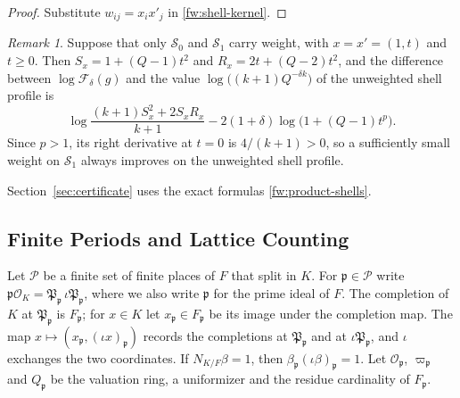 \documentclass[11pt]{amsart}
\numberwithin{equation}{section}
\theoremstyle{definition}
\theoremstyle{remark}
\newtheorem{remark}[equation]{Remark}
\begin{document}
\begin{proof}
Substitute $w_{ij}=x_ix'_j$ in \eqref{fw:shell-kernel}.
\end{proof}

\begin{remark}\label{fw:one-shell}
Suppose that only $\mathcal S_0$ and $\mathcal S_1$ carry weight, with
$x=x'=(1,t)$ and $t\ge0$. Then $S_x=1+(Q-1)t^2$ and
$R_x=2t+(Q-2)t^2$, and the difference between $\log\mathcal F_\delta(g)$
and the value $\log\bigl((k+1)Q^{-\delta k}\bigr)$ of the unweighted
shell profile is
\begin{equation}\label{fw:one-shell-gain}
 \log\frac{(k+1)S_x^2+2S_xR_x}{k+1}-2(1+\delta)\log\bigl(1+(Q-1)t^p\bigr).
\end{equation}
Since $p>1$, its right derivative at $t=0$ is $4/(k+1)>0$, so a
sufficiently small weight on $\mathcal S_1$ always improves on the
unweighted shell profile.
\end{remark}

Section~\ref{sec:certificate} uses the exact formulas
\eqref{fw:product-shells}.

\subsection{Finite Periods and Lattice Counting}

Let $\mathcal P$ be a finite set of finite places of $F$ that split in
$K$. For $\mathfrak p\in\mathcal P$ write $\mathfrak p\mathcal
O_K=\mathfrak P_{\mathfrak p}\,\iota\mathfrak P_{\mathfrak p}$, where we
also write $\mathfrak p$ for the prime ideal of $F$. The completion of
$K$ at $\mathfrak P_{\mathfrak p}$ is $F_{\mathfrak p}$; for $x\in K$ let
$x_{\mathfrak p}\in F_{\mathfrak p}$ be its image under the completion
map. The map $x\mapsto(x_{\mathfrak p},(\iota x)_{\mathfrak p})$ records
the completions at $\mathfrak P_{\mathfrak p}$ and at $\iota\mathfrak
P_{\mathfrak p}$, and $\iota$ exchanges the two coordinates. If
$N_{K/F}\beta=1$, then $\beta_{\mathfrak p}(\iota\beta)_{\mathfrak p}=1$.
Let $\mathcal O_{\mathfrak p}$, $\varpi_{\mathfrak p}$ and $Q_{\mathfrak
p}$ be the valuation ring, a uniformizer and the residue cardinality of
$F_{\mathfrak p}$.
\end{document}
